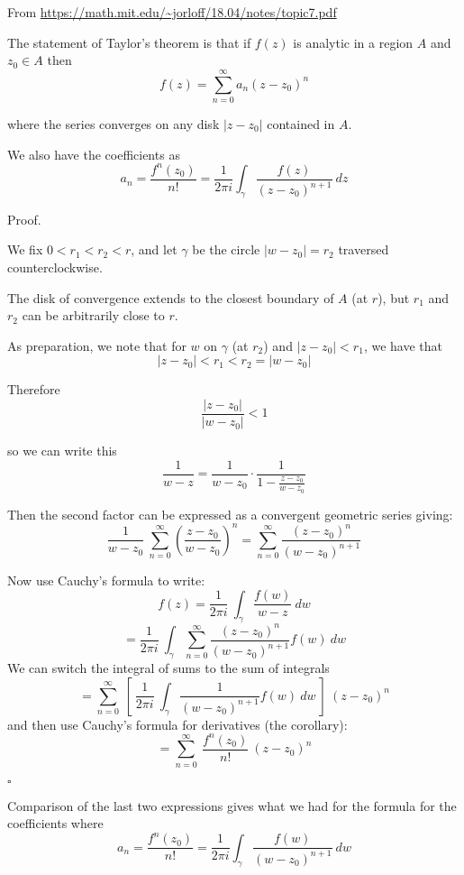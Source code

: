 \documentclass[11pt, oneside]{article}
\begin{document}
From \url{https://math.mit.edu/~jorloff/18.04/notes/topic7.pdf}

The statement of Taylor's theorem is that if $f(z)$ is analytic in a region $A$ and $z_0 \in A$ then
\[ f(z) = \sum_{n=0}^{\infty} a_n(z - z_0)^n \]

where the series converges on any disk $|z - z_0|$ contained in $A$.

We also have the coefficients as
\[ a_n = \frac{f^n(z_0)}{n!} = \frac{1}{2 \pi i} \int_{\gamma} \frac{f(z)}{(z - z_0)^{n+1}} \ dz \]

Proof.

We fix $0 < r_1 < r_2 < r$, and let $\gamma$ be the circle $|w - z_0| = r_2$ traversed counterclockwise.

The disk of convergence extends to the closest boundary of $A$ (at $r$), but $r_1$ and $r_2$ can be arbitrarily close to $r$.

As preparation, we note that for $w$ on $\gamma$ (at $r_2$) and $|z - z_0| < r_1$, we have that
\[ |z - z_0| < r_1 < r_2 = |w - z_0| \]

Therefore
\[ \frac{|z - z_0|}{|w - z_0|} < 1 \]

so we can write this
\[ \frac{1}{w - z} = \frac{1}{w - z_0} \cdot \frac{1}{1 - \frac{z-z_0}{w - z_0}} \]

Then the second factor can be expressed as a convergent geometric series giving:
\[ \frac{1}{w - z_0} \ \sum_{n=0}^{\infty} (\frac{z - z_0}{w - z_0})^n  = \sum_{n=0}^{\infty} \frac{(z - z_0)^n}{(w - z_0)^{n+1}} \]

Now use Cauchy's formula to write:
\[ f(z) = \frac{1}{2 \pi i} \ \int_{\gamma} \frac{f(w)}{w - z} \ dw \]
\[ = \frac{1}{2 \pi i} \ \int_{\gamma} \sum_{n=0}^{\infty} \frac{(z - z_0)^n}{(w - z_0)^{n+1}} f(w) \ dw \] 
We can switch the integral of sums to the sum of integrals
\[ = \sum_{n=0}^{\infty} \ [ \ \frac{1}{2 \pi i} \ \int_{\gamma} \frac{1}{(w - z_0)^{n+1}} f(w) \ dw \ ]  \ (z - z_0)^n \] 
and then use Cauchy's formula for derivatives (the corollary):
\[ = \sum_{n=0}^{\infty} \ \frac{f^n(z_0)}{n!} \ (z - z_0)^n \]

$\square$

Comparison of the last two expressions gives what we had for the formula for the coefficients where 
\[ a_n = \frac{f^n(z_0)}{n!} = \frac{1}{2 \pi i} \int_{\gamma} \frac{f(w)}{(w - z_0)^{n+1}} \ dw \]
\end{document}
